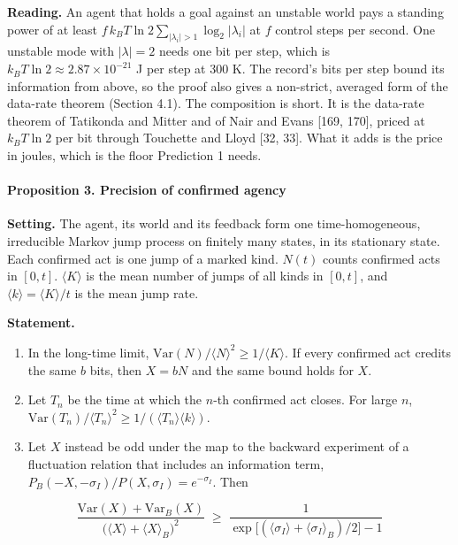 \documentclass[
  10pt,
]{article}
\providecommand{\tightlist}{%
  \setlength{\itemsep}{0pt}\setlength{\parskip}{0pt}}
\begin{document}
\textbf{Reading.} An agent that holds a goal against an unstable world
pays a standing power of at least
\(f\, k_B T\ln 2\sum_{|\lambda_i|>1}\log_2|\lambda_i|\) at \(f\) control
steps per second. One unstable mode with \(|\lambda| = 2\) needs one bit
per step, which is \(k_B T\ln 2 \approx 2.87\times10^{-21}\) J per step
at 300 K. The record's bits per step bound its information from above,
so the proof also gives a non-strict, averaged form of the data-rate
theorem (Section 4.1). The composition is short. It is the data-rate
theorem of Tatikonda and Mitter and of Nair and Evans {[}169, 170{]},
priced at \(k_B T\ln 2\) per bit through Touchette and Lloyd {[}32,
33{]}. What it adds is the price in joules, which is the floor
Prediction 1 needs.

\paragraph{Proposition 3. Precision of confirmed
agency}\label{proposition-3.-precision-of-confirmed-agency}

\textbf{Setting.} The agent, its world and its feedback form one
time-homogeneous, irreducible Markov jump process on finitely many
states, in its stationary state. Each confirmed act is one jump of a
marked kind. \(N(t)\) counts confirmed acts in \([0,t]\).
\(\langle K\rangle\) is the mean number of jumps of all kinds in
\([0,t]\), and \(\langle k\rangle = \langle K\rangle/t\) is the mean
jump rate.

\textbf{Statement.}

\begin{enumerate}
\def\labelenumi{\arabic{enumi}.}
\tightlist
\item
  In the long-time limit,
  \(\mathrm{Var}(N)/\langle N\rangle^2 \ge 1/\langle K\rangle\). If
  every confirmed act credits the same \(b\) bits, then \(X = bN\) and
  the same bound holds for \(X\).
\item
  Let \(T_n\) be the time at which the \(n\)-th confirmed act closes.
  For large \(n\),
  \(\mathrm{Var}(T_n)/\langle T_n\rangle^2 \ge 1/(\langle T_n\rangle\langle k\rangle)\).
\item
  Let \(X\) instead be odd under the map to the backward experiment of a
  fluctuation relation that includes an information term,
  \(P_B(-X,-\sigma_I)/P(X,\sigma_I) = e^{-\sigma_I}\). Then
\end{enumerate}

\[\frac{\mathrm{Var}(X) + \mathrm{Var}_B(X)}{\big(\langle X\rangle + \langle X\rangle_B\big)^2} \;\ge\; \frac{1}{\exp\!\big[(\langle\sigma_I\rangle + \langle\sigma_I\rangle_B)/2\big] - 1}\]
\end{document}
